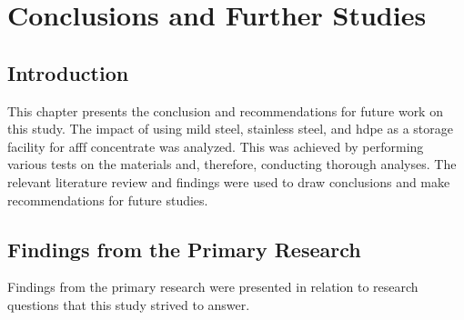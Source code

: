 \chapter{Conclusions and Further Studies}
\section{Introduction}
This chapter presents the conclusion and recommendations for future work on this study. The impact of using mild steel, stainless steel, and \acrshort{hdpe} as a storage facility for \acrshort{afff} concentrate was analyzed. This was achieved by performing various tests on the materials and, therefore, conducting thorough analyses. The relevant literature review and findings were used to draw conclusions and make recommendations for future studies.

\section{Findings from the Primary Research}
Findings from the primary research were presented in relation to research questions that this study strived to answer.


